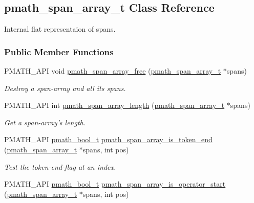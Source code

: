 \hypertarget{classpmath__span__array__t}{
\subsection{pmath\_\-span\_\-array\_\-t Class Reference}
\label{classpmath__span__array__t}
}
Internal flat representaion of spans.  


\subsubsection*{Public Member Functions}
\begin{CompactItemize}
\item 
PMATH\_\-API void \hyperlink{group__parser_gceb05ef4c39c239d68f39e3b9bde5f1e}{pmath\_\-span\_\-array\_\-free} (\hyperlink{classpmath__span__array__t}{pmath\_\-span\_\-array\_\-t} $\ast$spans)
\begin{CompactList}\small\item\em Destroy a span-array and all its spans. \item\end{CompactList}\item 
PMATH\_\-API int \hyperlink{group__parser_g30df905fabf7b04493548bcafe85d3d4}{pmath\_\-span\_\-array\_\-length} (\hyperlink{classpmath__span__array__t}{pmath\_\-span\_\-array\_\-t} $\ast$spans)
\begin{CompactList}\small\item\em Get a span-array's length. \item\end{CompactList}\item 
PMATH\_\-API \hyperlink{group__general__types_gc92090cb0b56345d6c379ed2341d4ef4}{pmath\_\-bool\_\-t} \hyperlink{group__parser_g0bb7df579ed425ec719cf2eb85093517}{pmath\_\-span\_\-array\_\-is\_\-token\_\-end} (\hyperlink{classpmath__span__array__t}{pmath\_\-span\_\-array\_\-t} $\ast$spans, int pos)
\begin{CompactList}\small\item\em Test the token-end-flag at an index. \item\end{CompactList}\item 
PMATH\_\-API \hyperlink{group__general__types_gc92090cb0b56345d6c379ed2341d4ef4}{pmath\_\-bool\_\-t} \hyperlink{group__parser_g7ca9a7b13aef344ba903b33f07ba912a}{pmath\_\-span\_\-array\_\-is\_\-operator\_\-start} (\hyperlink{classpmath__span__array__t}{pmath\_\-span\_\-array\_\-t} $\ast$spans, int pos)

\end{CompactItemize}
